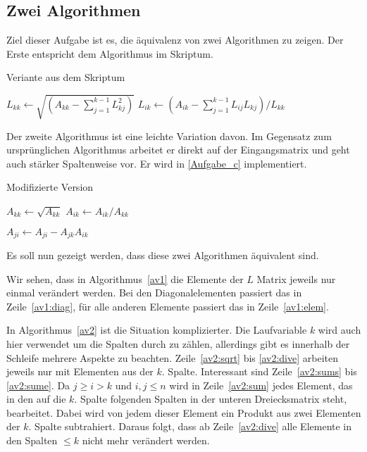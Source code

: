 \subsection{Zwei Algorithmen}
Ziel dieser Aufgabe ist es, die äquivalenz von zwei Algorithmen zu zeigen.
Der Erste entspricht dem Algorithmus im Skriptum. 
\begin{algorithm}
\caption{Veriante aus dem Skriptum}
\label{av1}
\begin{algorithmic}[1]
    \STATE $L_{kk}\gets \sqrt{(A_{kk}-\sum_{j=1}^{k-1}L_{kj}^2)}$ \label{av1:diag}
        \STATE $L_{ik}\gets (A_{ik}-\sum_{j=1}^{k-1}L_{ij}L_{kj})/L_{kk}$ \label{av1:elem}
    \ENDFOR
\ENDFOR
\end{algorithmic}
\end{algorithm}
Der zweite Algorithmus ist eine leichte Variation davon. Im Gegensatz zum
ursprünglichen Algorithmus arbeitet er direkt auf der Eingangsmatrix und
geht auch stärker Spaltenweise vor. Er wird in \ref{Aufgabe_c} implementiert.
\begin{algorithm}
\caption{Modifizierte Version}
\label{av2}
\begin{algorithmic}[1]
    \STATE $A_{kk}\gets \sqrt{A_{kk}}$ \label{av2:sqrt}
     \label{av2:divs}
        \STATE $A_{ik}\gets A_{ik}/A_{kk}$ \label{av2:div}
    \ENDFOR \label{av2:dive}

     \label{av2:sums}
            \STATE $A_{ji}\gets A_{ji}-A_{jk}A_{ik}$ \label{av2:sum}
        \ENDFOR
    \ENDFOR \label{av2:sume}
    \label{av2:suma}
\ENDFOR
\end{algorithmic}
\end{algorithm}

\newcommand{\linespanK}{Zeile~\ref{av2:sqrt} bis \ref{av2:dive} }
Es soll nun gezeigt werden, dass diese zwei Algorithmen äquivalent sind.

Wir sehen, dass in Algorithmus~\ref{av1} die Elemente der $L$ Matrix jeweils nur
einmal verändert werden. Bei den Diagonalelementen passiert das in Zeile~\ref{av1:diag},
für alle anderen Elemente passiert das in Zeile~\ref{av1:elem}. 

In Algorithmus~\ref{av2} ist die Situation komplizierter. Die Laufvariable $k$ wird auch 
hier verwendet um die Spalten durch zu zählen, allerdings gibt es innerhalb der
Schleife mehrere Aspekte zu beachten. \linespanK arbeiten
jeweils nur mit Elementen aus der $k$. Spalte. Interessant sind Zeile~\ref{av2:sums} bis
\ref{av2:sume}. Da $j\ge i>k$ und $i,j\le n$ wird in Zeile~\ref{av2:sum} jedes Element, 
das in den auf die $k$. Spalte folgenden Spalten in der unteren Dreiecksmatrix steht,
bearbeitet. Dabei wird von jedem dieser Element ein Produkt aus zwei Elementen der $k$.
Spalte subtrahiert. Daraus folgt, dass ab Zeile~\ref{av2:dive} alle Elemente in den
Spalten $\le k$ nicht mehr verändert werden.

